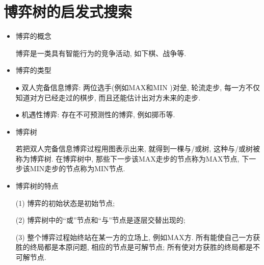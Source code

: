 \section{博弈树的启发式搜索}
\begin{itemize}
\item 博弈的概念

博弈是一类具有智能行为的竞争活动, 如下棋、战争等.
\item 博弈的类型

$\bullet$ 双人完备信息博弈: 两位选手(例如MAX和MIN )对垒, 轮流走步, 每一方不仅知道对方已经走过的棋步, 而且还能估计出对方未来的走步.

$\bullet$ 机遇性博弈: 存在不可预测性的博弈, 例如掷币等.
\item 博弈树

若把双人完备信息博弈过程用图表示出来, 就得到一棵与/或树, 这种与/或树被称为博弈树. 在博弈树中, 那些下一步该MAX走步的节点称为MAX节点, 下一步该MIN走步的节点称为MIN节点.
\item 博弈树的特点

(1) 博弈的初始状态是初始节点;

(2) 博弈树中的“或”节点和“与”节点是逐层交替出现的;

(3) 整个博弈过程始终站在某一方的立场上, 例如MAX方. 所有能使自己一方获胜的终局都是本原问题, 相应的节点是可解节点; 所有使对方获胜的终局都是不可解节点.
\end{itemize}
